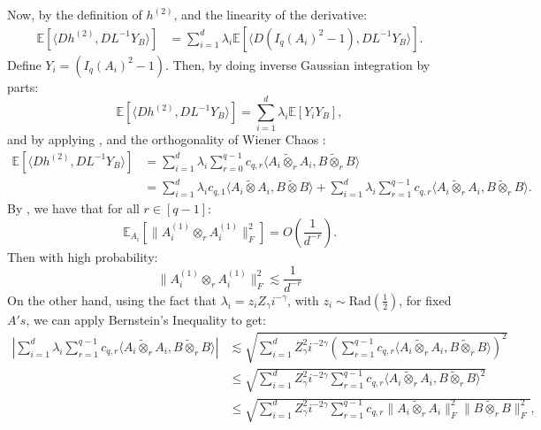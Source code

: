 \documentclass[]{article}
\numberwithin{equation}{section}
\theoremstyle{definition}
\newcommand{\EE}{\mathbb{E}}
\begin{document}
Now, by the definition of $h^{(2)}$, and the linearity of the derivative: 
\begin{align}
    \EE \left [ \langle Dh^{(2)}, DL^{-1}Y_{B } \rangle \right ]  & = \sum_{i=1}^{d} \lambda_{i} \EE \left [  \langle D(I_{q}(A_{i})^{2}-1), DL^{-1}Y_{B } \rangle  \right ].
\end{align}
Define $Y_{i} = (I_{q}(A_{i})^{2}-1)$. Then, by doing inverse Gaussian integration by parts: 
\begin{equation}
    \EE \left [ \langle Dh^{(2)}, DL^{-1}Y_{B } \rangle \right ]   = \sum_{i=1}^{d} \lambda_{i} \EE \left [ Y_{i}Y_{B}\right ],
\end{equation}
and by applying , and the orthogonality of Wiener Chaos : 
\begin{align}
    \EE \left [ \langle Dh^{(2)}, DL^{-1}Y_{B } \rangle \right ] &= \sum_{i=1}^{d} \lambda_{i} \sum_{r=0}^{q-1} c_{q,r} \langle A_{i} \tilde{\otimes}_{r} A_{i}, B\tilde{\otimes}_{r} B \rangle \\
    & = \sum_{i=1}^{d} \lambda_{i} c_{q,1}\langle A_{i} \tilde{\otimes} A_{i}, B\tilde{\otimes} B \rangle+ \sum_{i=1}^{d} \lambda_{i} \sum_{r=1}^{q-1} c_{q,r} \langle A_{i} \tilde{\otimes}_{r} A_{i}, B\tilde{\otimes}_{r} B \rangle.
    \label{eq:intermediate_step_2}
\end{align}
By , we have that for all $r \in [q-1]$:
\begin{equation}
    \EE_{A_i} \left [\|A_i^{(1)} \otimes_{r}A_i^{(1)}\|^{2}_{F} \right ] = O\left(\dfrac{1}{d^{-r}}\right ).
    \label{eq:intermediate_step_1}
\end{equation}
Then with high probability: 
\begin{equation}
    \|A_i^{(1)} \otimes_{r}A_i^{(1)}\|^{2}_{F} \lesssim  \dfrac{1}{d^{-r}}
    \label{eq:high_prob_bound_a_i_a_i}
\end{equation}
On the other hand, using the fact that $\lambda_{i}=z_{i}Z_{\gamma} i^{-\gamma}$, with $z_{i}\sim \mathrm{Rad}(\frac{1}{2})$, for fixed $A's$, we can apply Bernstein's Inequality \cite{vershynin2018high} to get: 
\begin{align}
    \left |\sum_{i=1}^{d} \lambda_{i} \sum_{r=1}^{q-1} c_{q,r} \langle A_{i} \tilde{\otimes}_{r} A_{i}, B\tilde{\otimes}_{r} B \rangle \right | & \lesssim \sqrt{\sum_{i=1}^{d} Z_{\gamma}^{2}i^{-2\gamma} \left ( \sum_{r=1}^{q-1} c_{q,r} \langle A_{i} \tilde{\otimes}_{r} A_{i}, B\tilde{\otimes}_{r} B \rangle  \right )^{2}} \\
    & \leq \sqrt{\sum_{i=1}^{d} Z_{\gamma}^{2}i^{-2\gamma}\sum_{r=1}^{q-1} c_{q,r} \langle A_{i} \tilde{\otimes}_{r} A_{i}, B\tilde{\otimes}_{r} B \rangle^{2}  } \\
    & \leq \sqrt{\sum_{i=1}^{d} Z_{\gamma}^{2}i^{-2\gamma}\sum_{r=1}^{q-1} c_{q,r} \| A_{i} \tilde{\otimes}_{r} A_{i}\|^{2}_{F}\| B\tilde{\otimes}_{r} B \|_{F}^{2}  },
\end{align}
\end{document}
